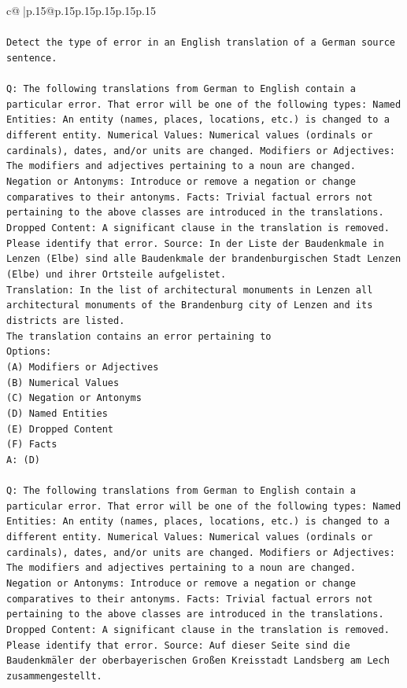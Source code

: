 \documentclass{article}
\begin{document}
{\begin{supertabular}{c@{$\;$}|p{.15\linewidth}@{}p{.15\linewidth}p{.15\linewidth}p{.15\linewidth}p{.15\linewidth}p{.15\linewidth}}
{{{\\ 
\\ 
\texttt{Detect the type of error in an English translation of a German source sentence.} \\
\\ 
\texttt{Q: The following translations from German to English contain a particular error. That error will be one of the following types: Named Entities: An entity (names, places, locations, etc.) is changed to a different entity. Numerical Values: Numerical values (ordinals or cardinals), dates, and/or units are changed. Modifiers or Adjectives: The modifiers and adjectives pertaining to a noun are changed. Negation or Antonyms: Introduce or remove a negation or change comparatives to their antonyms. Facts: Trivial factual errors not pertaining to the above classes are introduced in the translations. Dropped Content: A significant clause in the translation is removed. Please identify that error.  Source: In der Liste der Baudenkmale in Lenzen (Elbe) sind alle Baudenkmale der brandenburgischen Stadt Lenzen (Elbe) und ihrer Ortsteile aufgelistet.} \\
\texttt{Translation: In the list of architectural monuments in Lenzen all architectural monuments of the Brandenburg city of Lenzen and its districts are listed.} \\
\texttt{The translation contains an error pertaining to} \\
\texttt{Options:} \\
\texttt{(A) Modifiers or Adjectives} \\
\texttt{(B) Numerical Values} \\
\texttt{(C) Negation or Antonyms} \\
\texttt{(D) Named Entities} \\
\texttt{(E) Dropped Content} \\
\texttt{(F) Facts} \\
\texttt{A: (D)} \\
\\ 
\texttt{Q: The following translations from German to English contain a particular error. That error will be one of the following types: Named Entities: An entity (names, places, locations, etc.) is changed to a different entity. Numerical Values: Numerical values (ordinals or cardinals), dates, and/or units are changed. Modifiers or Adjectives: The modifiers and adjectives pertaining to a noun are changed. Negation or Antonyms: Introduce or remove a negation or change comparatives to their antonyms. Facts: Trivial factual errors not pertaining to the above classes are introduced in the translations. Dropped Content: A significant clause in the translation is removed. Please identify that error.  Source: Auf dieser Seite sind die Baudenkmäler der oberbayerischen Großen Kreisstadt Landsberg am Lech zusammengestellt.} \\
}}}
\end{supertabular}}
\end{document}
